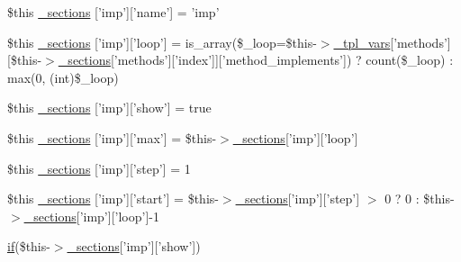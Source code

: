 \begin{DoxyCompactItemize}
\$this \hyperlink{34d6fa4bfd5eef6424a9ddc74a166350_2_06_06-14_05_06_06-1407541581_05method_8tpl_8php_a0accdaaabc80cf5dea3de9bde64989f4}{\-\_\-sections} \mbox{[}'imp'\mbox{]}\mbox{[}'name'\mbox{]} = 'imp'
\item 
\$this \hyperlink{34d6fa4bfd5eef6424a9ddc74a166350_2_06_06-14_05_06_06-1407541581_05method_8tpl_8php_a9e7ef0bc5f5cad2c3eeffe0e85dacfe2}{\-\_\-sections} \mbox{[}'imp'\mbox{]}\mbox{[}'loop'\mbox{]} = is\-\_\-array(\$\-\_\-loop=\$this-\/$>$\hyperlink{_06_06127_05_06_0612781687_05pkgelementindex_8tpl_8php_a4a4846d8e68d455590131a05697f67a3}{\-\_\-tpl\-\_\-vars}\mbox{[}'methods'\mbox{]}\mbox{[}\$this-\/$>$\hyperlink{_06_06127_05_06_0612781687_05pkgelementindex_8tpl_8php_a9e3d26b39edfe29c3f29b8035ef33828}{\-\_\-sections}\mbox{[}'methods'\mbox{]}\mbox{[}'index'\mbox{]}\mbox{]}\mbox{[}'method\-\_\-implements'\mbox{]}) ? count(\$\-\_\-loop) \-: max(0, (int)\$\-\_\-loop)
\item 
\$this \hyperlink{34d6fa4bfd5eef6424a9ddc74a166350_2_06_06-14_05_06_06-1407541581_05method_8tpl_8php_ab34e45ac83e6be02ba4da97523aa9253}{\-\_\-sections} \mbox{[}'imp'\mbox{]}\mbox{[}'show'\mbox{]} = true
\item 
\$this \hyperlink{34d6fa4bfd5eef6424a9ddc74a166350_2_06_06-14_05_06_06-1407541581_05method_8tpl_8php_a72afb3c599b7d132e7a48cbe46dabb42}{\-\_\-sections} \mbox{[}'imp'\mbox{]}\mbox{[}'max'\mbox{]} = \$this-\/$>$\hyperlink{_06_06127_05_06_0612781687_05pkgelementindex_8tpl_8php_a9e3d26b39edfe29c3f29b8035ef33828}{\-\_\-sections}\mbox{[}'imp'\mbox{]}\mbox{[}'loop'\mbox{]}
\item 
\$this \hyperlink{34d6fa4bfd5eef6424a9ddc74a166350_2_06_06-14_05_06_06-1407541581_05method_8tpl_8php_ac7e9e053f36ea23aa6934f2533aac365}{\-\_\-sections} \mbox{[}'imp'\mbox{]}\mbox{[}'step'\mbox{]} = 1
\item 
\$this \hyperlink{34d6fa4bfd5eef6424a9ddc74a166350_2_06_06-14_05_06_06-1407541581_05method_8tpl_8php_a1a4a2efa6cee9bc20cf1fa3f78ba7d41}{\-\_\-sections} \mbox{[}'imp'\mbox{]}\mbox{[}'start'\mbox{]} = \$this-\/$>$\hyperlink{_06_06127_05_06_0612781687_05pkgelementindex_8tpl_8php_a9e3d26b39edfe29c3f29b8035ef33828}{\-\_\-sections}\mbox{[}'imp'\mbox{]}\mbox{[}'step'\mbox{]} $>$ 0 ? 0 \-: \$this-\/$>$\hyperlink{_06_06127_05_06_0612781687_05pkgelementindex_8tpl_8php_a9e3d26b39edfe29c3f29b8035ef33828}{\-\_\-sections}\mbox{[}'imp'\mbox{]}\mbox{[}'loop'\mbox{]}-\/1
\item 
\hyperlink{_setup_8inc_8php_ad0184337b31d13763ec8751feff4aabe}{if}(\$this-\/$>$\hyperlink{_06_06127_05_06_0612781687_05pkgelementindex_8tpl_8php_a9e3d26b39edfe29c3f29b8035ef33828}{\-\_\-sections}\mbox{[}'imp'\mbox{]}\mbox{[}'show'\mbox{]}) \*

\end{DoxyCompactItemize}
